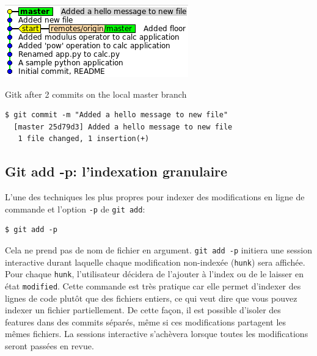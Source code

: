 \documentclass{../../common/tufte-latex/tufte-handout}
\begin{document}
\begin{marginfigure}%
  \centering
  \includegraphics[width=\linewidth]{gitk-2commits.png}
  \label{fig:gitk2commits}
  \caption{Gitk after 2 commits on the local master branch}
\end{marginfigure}

\begin{lstlisting}[style=BashInputStyle]
  $ git commit -m "Added a hello message to new file"
  [master 25d79d3] Added a hello message to new file
   1 file changed, 1 insertion(+)
\end{lstlisting}

\subsection{Git add -p: l'indexation granulaire}

L'une des techniques les plus propres pour indexer des modifications en ligne de commande et l'option \texttt{-p} de \texttt{git add}:

\begin{lstlisting}[style=BashInputStyle]
  $ git add -p
\end{lstlisting}

Cela ne prend pas de nom de fichier en argument.
\texttt{git add -p} initiera une session interactive durant laquelle chaque modification non-indexée (\texttt{hunk}) sera affichée. Pour chaque \texttt{hunk}, l'utilisateur décidera de l'ajouter à l'index ou de le laisser en état \texttt{modified}. 
Cette commande est très pratique car elle permet d'indexer des lignes de code plutôt que des fichiers entiers, ce qui veut dire que vous pouvez indexer un fichier partiellement.
De cette façon, il est possible d'isoler des features dans des commits séparés, même si ces modifications partagent les mêmes fichiers.
La sessions interactive s'achèvera lorsque toutes les modifications seront passées en revue.
\end{document}
